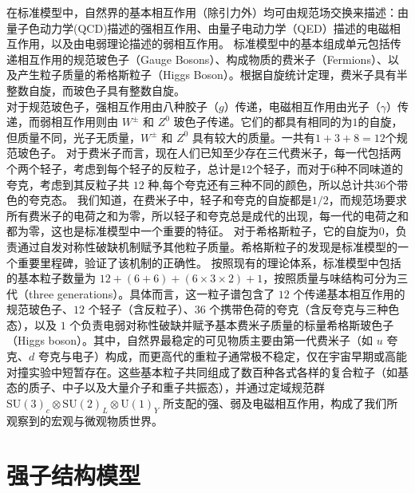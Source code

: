 在标准模型中，自然界的基本相互作用（除引力外）均可由规范场交换来描述：由量子色动力学(QCD)描述的强相互作用、由量子电动力学（QED）描述的电磁相互作用，以及由电弱理论描述的弱相互作用。
标准模型中的基本组成单元包括传递相互作用的规范玻色子（Gauge Bosons）、构成物质的费米子（Fermions）、以及产生粒子质量的希格斯粒子（Higgs Boson）。根据自旋统计定理，费米子具有半整数自旋，而玻色子具有整数自旋。\\

对于规范玻色子，强相互作用由八种胶子（$g$）传递，电磁相互作用由光子（$\gamma$）传递，而弱相互作用则由 $W^\pm$ 和 $Z^0$ 玻色子传递。它们的都具有相同的为$1$的自旋，但质量不同，光子无质量，$W^\pm$ 和 $Z^0$ 具有较大的质量。一共有$1+3+8=12$个规范玻色子。
对于费米子而言，现在人们已知至少存在三代费米子，每一代包括两个两个轻子，考虑到每个轻子的反粒子，总计是$12$个轻子，而对于$6$种不同味道的夸克，考虑到其反粒子共 $12$ 种,每个夸克还有三种不同的颜色，所以总计共$36$个带色的夸克态。
我们知道，在费米子中，轻子和夸克的自旋都是$1/2$，而规范场要求所有费米子的电荷之和为零，所以轻子和夸克总是成代的出现，每一代的电荷之和都为零，这也是标准模型中一个重要的特征。
对于希格斯粒子，它的自旋为$0$，负责通过自发对称性破缺机制赋予其他粒子质量。希格斯粒子的发现是标准模型的一个重要里程碑，验证了该机制的正确性。
按照现有的理论体系，标准模型中包括的基本粒子数量为 $12+(6+6)+(6\times3\times2)+ 1$，按照质量与味结构可分为三代（three generations）。具体而言，这一粒子谱包含了 $12$ 个传递基本相互作用的规范玻色子、$12$ 个轻子（含反粒子）、$36$ 个携带色荷的夸克（含反夸克与三种色态），以及 $1$ 个负责电弱对称性破缺并赋予基本费米子质量的标量希格斯玻色子（Higgs boson）。其中，自然界最稳定的可见物质主要由第一代费米子（如 $u$ 夸克、$d$ 夸克与电子）构成，而更高代的重粒子通常极不稳定，仅在宇宙早期或高能对撞实验中短暂存在。这些基本粒子共同组成了数百种各式各样的复合粒子（如基态的质子、中子以及大量介子和重子共振态），并通过定域规范群 $\mathrm{SU}(3)_c \otimes \mathrm{SU}(2)_L \otimes \mathrm{U}(1)_Y$ 所支配的强、弱及电磁相互作用，构成了我们所观察到的宏观与微观物质世界。\\
\section{强子结构模型}

